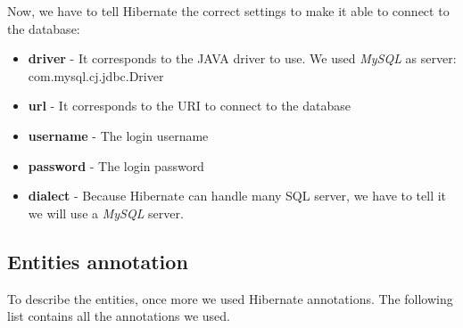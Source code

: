 Now, we have to tell Hibernate the correct settings to make it able to connect to the database:
\begin{itemize}
	\item \textbf{driver} - It corresponds to the JAVA driver to use. We used \textit{MySQL} as server: com.mysql.cj.jdbc.Driver
	\item \textbf{url} - It corresponds to the URI to connect to the database
	\item \textbf{username} - The login username
	\item \textbf{password} - The login password
	\item \textbf{dialect} - Because Hibernate can handle many SQL server, we have to tell it we will use a \textit{MySQL} server. 
\end{itemize}

\subsection{Entities annotation}
To describe the entities, once more we used Hibernate annotations. The following list contains all the annotations we used.

